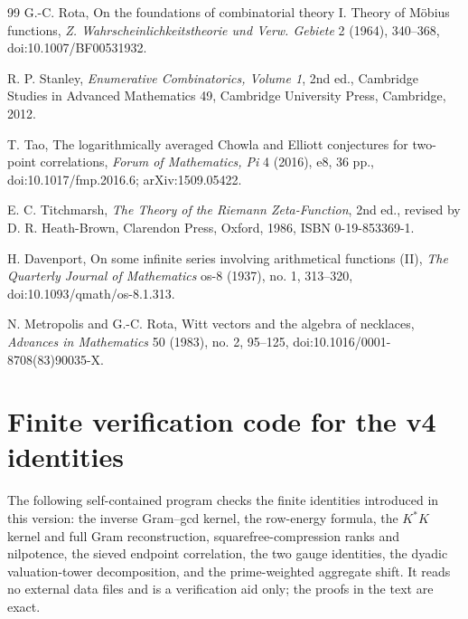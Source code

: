 \documentclass[11pt]{amsart}
\numberwithin{equation}{section}
\theoremstyle{plain}
\theoremstyle{definition}
\theoremstyle{remark}
\begin{document}
\begin{thebibliography}{99}
G.-C. Rota,
On the foundations of combinatorial theory I. Theory of Möbius functions,
\emph{Z. Wahrscheinlichkeitstheorie und Verw. Gebiete} 2 (1964), 340--368,
doi:10.1007/BF00531932.

R. P. Stanley,
\emph{Enumerative Combinatorics, Volume 1},
2nd ed., Cambridge Studies in Advanced Mathematics 49,
Cambridge University Press, Cambridge, 2012.

T. Tao,
The logarithmically averaged Chowla and Elliott conjectures for two-point correlations,
\emph{Forum of Mathematics, Pi} 4 (2016), e8, 36 pp.,
doi:10.1017/fmp.2016.6; arXiv:1509.05422.

E. C. Titchmarsh,
\emph{The Theory of the Riemann Zeta-Function},
2nd ed., revised by D. R. Heath-Brown,
Clarendon Press, Oxford, 1986, ISBN 0-19-853369-1.


H. Davenport,
On some infinite series involving arithmetical functions (II),
\emph{The Quarterly Journal of Mathematics} os-8 (1937), no. 1, 313--320,
doi:10.1093/qmath/os-8.1.313.

N. Metropolis and G.-C. Rota,
Witt vectors and the algebra of necklaces,
\emph{Advances in Mathematics} 50 (1983), no. 2, 95--125,
doi:10.1016/0001-8708(83)90035-X.

\end{thebibliography}

\appendix

\section{Finite verification code for the v4 identities}
\label{app:verification_code}

The following self-contained program checks the finite identities introduced in this version: the inverse Gram--gcd kernel, the row-energy formula, the $K^*K$ kernel and full Gram reconstruction, squarefree-compression ranks and nilpotence, the sieved endpoint correlation, the two gauge identities, the dyadic valuation-tower decomposition, and the prime-weighted aggregate shift.  It reads no external data files and is a verification aid only; the proofs in the text are exact.
\end{document}
